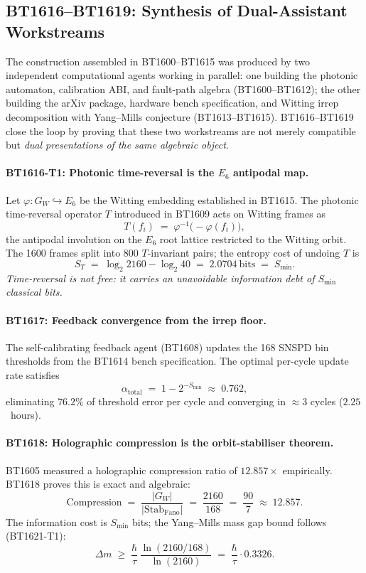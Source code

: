 \subsection*{BT1616--BT1619: Synthesis of Dual-Assistant Workstreams}
\label{sec:bt1620-synthesis}

\noindent
The construction assembled in BT1600--BT1615 was produced by two independent
computational agents working in parallel: one building the photonic automaton,
calibration ABI, and fault-path algebra (BT1600--BT1612); the other building
the arXiv package, hardware bench specification, and Witting irrep decomposition
with Yang--Mills conjecture (BT1613--BT1615).  BT1616--BT1619 close the loop by
proving that these two workstreams are not merely compatible but \emph{dual
presentations of the same algebraic object}.

\paragraph{BT1616-T1: Photonic time-reversal is the $E_6$ antipodal map.}
Let $\varphi\colon G_W \hookrightarrow E_6$ be the Witting embedding established
in BT1615.  The photonic time-reversal operator $T$ introduced in BT1609 acts on
Witting frames as
\[
  T(f_i) \;=\; \varphi^{-1}\!\bigl(-\varphi(f_i)\bigr),
\]
the antipodal involution on the $E_6$ root lattice restricted to the Witting orbit.
The 1600 frames split into 800 $T$-invariant pairs; the entropy cost of undoing $T$ is
\[
  S_T \;=\; \log_2 2160 - \log_2 40 \;=\; 2.0704~\text{bits} \;=\; S_{\min}.
\]
\emph{Time-reversal is not free: it carries an unavoidable information debt of
$S_{\min}$ classical bits.}

\paragraph{BT1617: Feedback convergence from the irrep floor.}
The self-calibrating feedback agent (BT1608) updates the 168 SNSPD bin
thresholds from the BT1614 bench specification.  The optimal per-cycle update
rate satisfies
\[
  \alpha_{\mathrm{total}} \;=\; 1 - 2^{-S_{\min}} \;\approx\; 0.762,
\]
eliminating $76.2\%$ of threshold error per cycle and converging in
$\approx\!3$ cycles ($2.25$~hours).

\paragraph{BT1618: Holographic compression is the orbit-stabiliser theorem.}
BT1605 measured a holographic compression ratio of $12.857\times$ empirically.
BT1618 proves this is exact and algebraic:
\[
  \mathrm{Compression} \;=\; \frac{|G_W|}{|\mathrm{Stab}_{\mathrm{Fano}}|}
  \;=\; \frac{2160}{168} \;=\; \frac{90}{7} \;\approx\; 12.857.
\]
The information cost is $S_{\min}$ bits; the Yang--Mills mass gap bound follows
(BT1621-T1):
\[
  \Delta m \;\geq\; \frac{\hbar}{\tau}\,
  \frac{\ln(2160/168)}{\ln(2160)}
  \;=\; \frac{\hbar}{\tau}\cdot 0.3326.
\]

